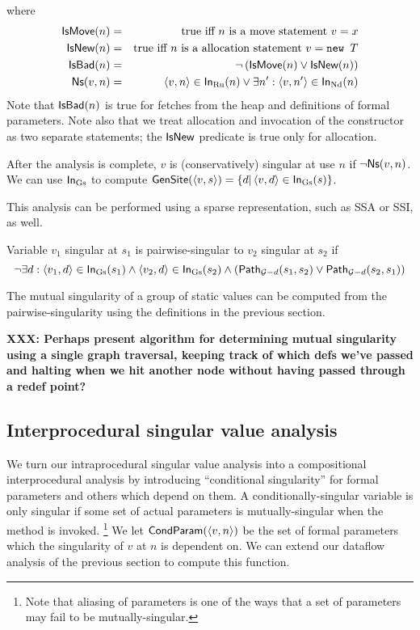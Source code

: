 \documentclass[11pt,notitlepage]{article}
\newcommand{\func}[1]{\ensuremath{\text{\sffamily #1}}}
\begin{document}
where
\begin{eqnarray*}
\func{IsMove}(n) &=& \text{true iff }n\text{ is a move statement } v=x\\
\func{IsNew}(n) &=& \text{true iff }n\text{ is a allocation statement } v=\text{\tt new }T\\
\func{IsBad}(n) &=& \neg\left(\func{IsMove}(n) \vee \func{IsNew}(n)\right) \\
\func{Ns}(v,n) &=&
\tuple{v,n} \in \func{In}_\text{Ru}(n) \vee
\exists n': \tuple{v,n'}\in\func{In}_\text{Nd}(n)
\end{eqnarray*}
Note that $\func{IsBad}(n)$ is true for fetches from the heap and
definitions of formal parameters.  Note also that we treat allocation
and invocation of the constructor as two separate statements; the
$\func{IsNew}$ predicate is true only for allocation.

After the analysis is complete, $v$ is (conservatively) singular at
use $n$ if $\neg\func{Ns}(v,n)$.   We can use $\func{In}_\text{Gs}$ to
compute
$\func{GenSite}(\tuple{v,s})=\left\{ d | \tuple{v,d}\in\func{In}_\text{Gs}(s) \right\}$.

This analysis can be performed using a sparse representation, such as
SSA or SSI, as well.

Variable $v_1$ singular at $s_1$ is pairwise-singular to $v_2$
singular at $s_2$ if
\begin{displaymath}
\neg\exists 
     d : \tuple{v_1, d} \in \func{In}_\text{Gs}(s_1) \wedge
         \tuple{v_2, d} \in \func{In}_\text{Gs}(s_2) \wedge
\left(\func{Path}_{\mathcal{G}-d}(s_1, s_2) \vee
      \func{Path}_{\mathcal{G}-d}(s_2, s_1) \right)
\end{displaymath}

The mutual singularity of a group of static values can be computed
from the pairwise-singularity using the definitions in the previous
section.

\textbf{XXX: Perhaps present algorithm for determining mutual
singularity using a single graph traversal, keeping track of which
defs we've passed and halting when we hit another node without
having passed through a redef point?}

\subsection{Interprocedural singular value analysis}

We turn our intraprocedural singular value analysis into a compositional
interprocedural analysis by introducing ``conditional singularity''
for formal parameters and others which depend on them.  A
conditionally-singular variable is only singular if some set of actual
parameters is mutually-singular when the method is invoked.%
\footnote{Note that aliasing of parameters is one of the ways that
a set of parameters may fail to be mutually-singular.}
We let
$\func{CondParam}(\tuple{v,n})$ be the set of formal parameters which the
singularity of $v$ at $n$ is dependent on.  We can extend our dataflow
analysis of the previous section to compute this function.
\end{document}
